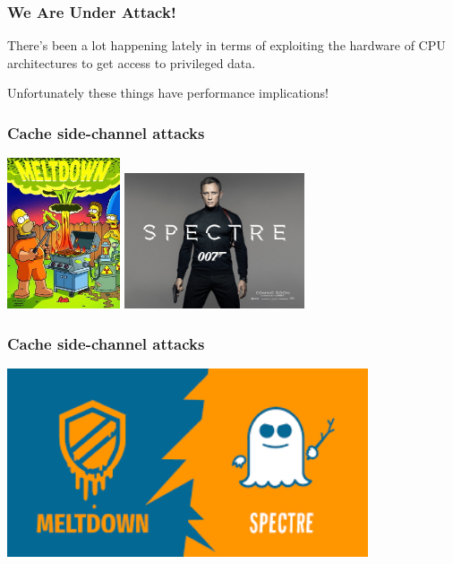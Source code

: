 \begin{frame}
\frametitle{We Are Under Attack!}

There's been a lot happening lately in terms of exploiting the hardware of CPU architectures to get access to privileged data. 

Unfortunately these things have performance implications!

\end{frame}


\begin{frame}
\frametitle{Cache side-channel attacks}

\begin{center}
\includegraphics[width=0.25\textwidth]{images/meltdown.jpg}
\includegraphics[width=0.40\textwidth]{images/spectre.jpg}
\end{center}

\end{frame}



\begin{frame}
\frametitle{Cache side-channel attacks}

\begin{center}
\includegraphics[width=0.8\textwidth]{images/meltdown-spectre.png}
\end{center}


\end{frame}

